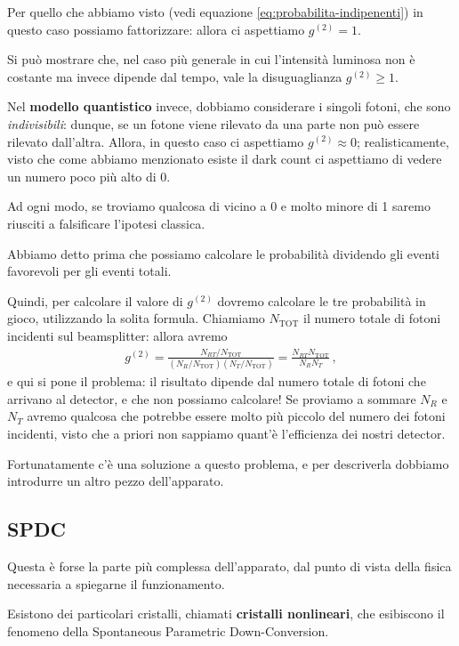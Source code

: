 \documentclass{article}
\begin{document}
Per quello che abbiamo visto (vedi equazione \eqref{eq:probabilita-indipenenti}) in questo caso possiamo fattorizzare: allora ci aspettiamo \(g^{(2)} = 1\). 

Si può mostrare che, nel caso più generale in cui l'intensità luminosa non è costante ma invece dipende dal tempo, vale la disuguaglianza \(g^{(2)} \geq 1\).

Nel \textbf{modello quantistico} invece, dobbiamo considerare i singoli fotoni, che sono \emph{indivisibili}: dunque, se un fotone viene rilevato da una parte non può essere rilevato dall'altra. Allora, in questo caso ci aspettiamo \(g^{(2)} \approx 0\); realisticamente, visto che come abbiamo menzionato esiste il dark count ci aspettiamo di vedere un numero poco più alto di 0.

Ad ogni modo, se troviamo qualcosa di vicino a 0 e molto minore di 1 saremo riusciti a falsificare l'ipotesi classica.

Abbiamo detto prima che possiamo calcolare le probabilità dividendo gli eventi favorevoli per gli eventi totali.

Quindi, per calcolare il valore di \(g^{(2)}\) dovremo calcolare le tre probabilità in gioco, utilizzando la solita formula. Chiamiamo \(N _{\text{TOT}}\) il numero totale di fotoni incidenti sul beamsplitter: allora avremo 
%
\begin{align}
g^{(2)} = \frac{N_{RT} / N _{\text{TOT}}}{(N_R / N _{\text{TOT}}) (N_T / N _{\text{TOT}})} = \frac{N_{RT} N _{\text{TOT}}}{N_R N_T}
\,,
\end{align}
%
e qui si pone il problema: il risultato dipende dal numero totale di fotoni che arrivano al detector, e che non possiamo calcolare! Se proviamo a sommare \(N_R\) e \(N_T\) avremo qualcosa che potrebbe essere molto più piccolo del numero dei fotoni incidenti, visto che a priori non sappiamo quant'è l'efficienza dei nostri detector.

Fortunatamente c'è una soluzione a questo problema, e per descriverla dobbiamo introdurre un altro pezzo dell'apparato.

\subsection{SPDC}

Questa è forse la parte più complessa dell'apparato, dal punto di vista della fisica necessaria a spiegarne il funzionamento.

Esistono dei particolari cristalli, chiamati \textbf{cristalli nonlineari}, che esibiscono il fenomeno della Spontaneous Parametric Down-Conversion.
\end{document}
